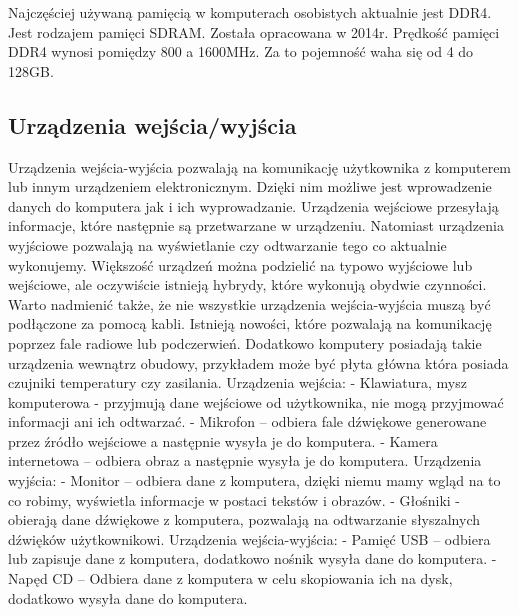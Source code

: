 \documentclass[12pt, a4paper, onside, polish]{article}				%
\begin{document}
Najczęściej używaną pamięcią w komputerach osobistych aktualnie jest DDR4. Jest rodzajem pamięci SDRAM. Została opracowana w 2014r. Prędkość pamięci DDR4 wynosi pomiędzy 800 a 1600MHz. Za to pojemność waha się od 4 do 128GB.  


\subsection{Urządzenia wejścia/wyjścia}
\hspace{\parindent}
Urządzenia wejścia-wyjścia pozwalają na komunikację użytkownika z komputerem lub innym urządzeniem elektronicznym. Dzięki nim możliwe jest wprowadzenie danych do komputera jak i ich wyprowadzanie. Urządzenia wejściowe przesyłają informacje, które następnie są przetwarzane w urządzeniu. Natomiast urządzenia wyjściowe pozwalają na wyświetlanie czy odtwarzanie tego co aktualnie wykonujemy. Większość urządzeń można podzielić na typowo wyjściowe lub wejściowe, ale oczywiście istnieją hybrydy, które wykonują obydwie czynności. Warto nadmienić także, że nie wszystkie urządzenia wejścia-wyjścia muszą być podłączone za pomocą kabli. Istnieją nowości, które pozwalają na komunikację poprzez fale radiowe lub podczerwień. Dodatkowo komputery posiadają takie urządzenia wewnątrz obudowy, przykładem może być płyta główna która posiada czujniki temperatury czy zasilania.  \newline\newline
Urządzenia wejścia: \newline
- Klawiatura, mysz komputerowa - przyjmują dane wejściowe od użytkownika, nie mogą przyjmować informacji ani ich odtwarzać. \newline
- Mikrofon – odbiera fale dźwiękowe generowane przez źródło wejściowe a następnie wysyła je do komputera. \newline
- Kamera internetowa – odbiera obraz a następnie wysyła je do komputera. \newline\newline
 Urządzenia wyjścia: \newline
- Monitor – odbiera dane z komputera, dzięki niemu mamy wgląd na to co robimy, wyświetla informacje w postaci tekstów i obrazów. \newline
- Głośniki - obierają dane dźwiękowe z komputera, pozwalają na odtwarzanie słyszalnych dźwięków użytkownikowi. \newline\newline
Urządzenia wejścia-wyjścia: \newline
- Pamięć USB – odbiera lub zapisuje dane z komputera, dodatkowo nośnik wysyła dane do komputera. \newline
- Napęd CD – Odbiera dane z komputera w celu skopiowania ich na dysk, dodatkowo wysyła dane do komputera. \newline
\end{document}
